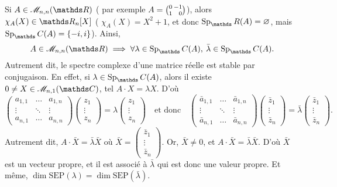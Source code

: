 \begin{rmk}
	Si $A \in \mathscr{M}_{n,n}(\R)$ ({\color{yellow} par exemple $A = {0\hfill\:-1\choose 1\hfill\:0}$}), alors $\chi_A(X) \in \R_{n}[X]$ ({\color{yellow} $\chi_A(X) = X^2 + 1$, et donc $\Sp_\R(A) = \O$, mais $\Sp_\C(A) = \{-i,i\}$}).
	 Ainsi, \[
	 	A \in \mathscr{M}_{n,n}(\R) \implies\forall \lambda \in \Sp_\C(A),\: \bar{\lambda} \in \Sp_\C(A)
	 .\] Autrement dit, le spectre complexe d'une matrice réelle est stable par conjugaison.
	 En effet, si $\lambda \in \Sp_\C(A)$, alors il existe $0 \neq X \in \mathscr{M}_{n,1}(\C)$, tel $A\cdot X = \lambda X$. D'où \[
	 	\begin{pmatrix}
			a_{1,1}&\ldots&a_{1,n}\\
			\vdots&\ddots&\vdots\\
			a_{n,1}&\ldots&a_{n,n}
	 	\end{pmatrix} \begin{pmatrix}
	 		z_1\\
			\vdots\\
			z_n
	 	\end{pmatrix} = \lambda \begin{pmatrix}
	 		z_1\\
			\vdots\\
			z_n
	 	\end{pmatrix} \quad\text{et donc}\quad
		\begin{pmatrix}
			\bar{a}_{1,1}&\ldots&\bar{a}_{1,n}\\
			\vdots&\ddots&\vdots\\
			\bar{a}_{n,1}&\ldots&\bar{a}_{n,n}
	 	\end{pmatrix} \begin{pmatrix}
	 		\bar{z}_1\\
			\vdots\\
			\bar{z}_n
	 	\end{pmatrix} = \bar\lambda \begin{pmatrix}
	 		\bar{z}_1\\
			\vdots\\
			\bar{z}_n
	 	\end{pmatrix}
	 .\] Autrement dit, $A \cdot \bar{X} = \bar\lambda \bar{X}$\/ où $\bar{X} = \left( \substack{\bar{z}_1\\ \vdots\\ \bar{z}_n} \right)$. Or, $\bar{X} \neq 0$, et $A\cdot \bar{X} = \bar{\lambda}\bar{X}$. D'où $\bar{X}$\/ est un vecteur propre, et il est associé à $\bar{\lambda}$\/ qui est donc une valeur propre.
	 Et même, $\dim \mathrm{SEP}(\lambda) = \dim \mathrm{SEP}(\bar\lambda)$.
\end{rmk}

